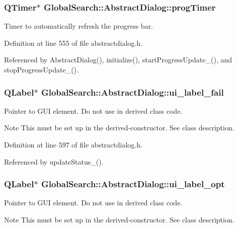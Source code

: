 \subsubsection[{prog\+Timer}]{\setlength{\rightskip}{0pt plus 5cm}Q\+Timer$\ast$ Global\+Search\+::\+Abstract\+Dialog\+::prog\+Timer\hspace{0.3cm}{\ttfamily [protected]}}\label{classGlobalSearch_1_1AbstractDialog_a1cf317e8206fd80628a9fe6d2ec711fc}
Timer to automatically refresh the progress bar. 

Definition at line 555 of file abstractdialog.\+h.



Referenced by Abstract\+Dialog(), initialize(), start\+Progress\+Update\+\_\+(), and stop\+Progress\+Update\+\_\+().

\hypertarget{classGlobalSearch_1_1AbstractDialog_a28b127a410ed219e13a0e85c889934e7}{}
\subsubsection[{ui\+\_\+label\+\_\+fail}]{\setlength{\rightskip}{0pt plus 5cm}Q\+Label$\ast$ Global\+Search\+::\+Abstract\+Dialog\+::ui\+\_\+label\+\_\+fail\hspace{0.3cm}{\ttfamily [protected]}}\label{classGlobalSearch_1_1AbstractDialog_a28b127a410ed219e13a0e85c889934e7}
Pointer to G\+U\+I element. Do not use in derived class code. \begin{DoxyNote}{Note}
This must be set up in the derived-\/constructor. See class description. 
\end{DoxyNote}


Definition at line 597 of file abstractdialog.\+h.



Referenced by update\+Status\+\_\+().

\hypertarget{classGlobalSearch_1_1AbstractDialog_af30548b5ed4d5a22a7dc648afae4115b}{}
\subsubsection[{ui\+\_\+label\+\_\+opt}]{\setlength{\rightskip}{0pt plus 5cm}Q\+Label$\ast$ Global\+Search\+::\+Abstract\+Dialog\+::ui\+\_\+label\+\_\+opt\hspace{0.3cm}{\ttfamily [protected]}}\label{classGlobalSearch_1_1AbstractDialog_af30548b5ed4d5a22a7dc648afae4115b}
Pointer to G\+U\+I element. Do not use in derived class code. \begin{DoxyNote}{Note}
This must be set up in the derived-\/constructor. See class description. 
\end{DoxyNote}


